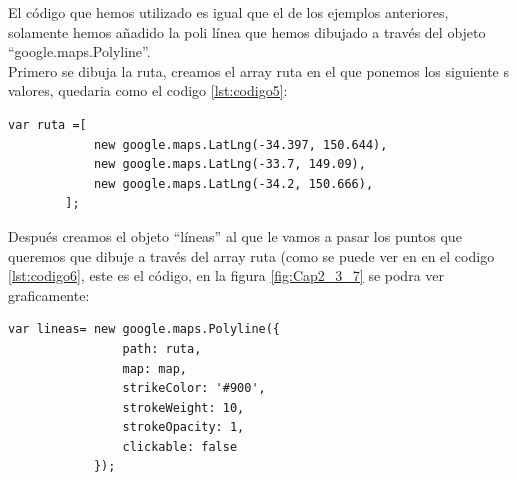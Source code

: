     
     \hspace*{1cm}El código que hemos utilizado es igual que el de los ejemplos anteriores,           solamente hemos añadido la poli línea que hemos dibujado a través del objeto        “google.maps.Polyline”.\\
    Primero se dibuja la ruta, creamos el array ruta en el que ponemos los siguiente     s valores, quedaria como el codigo \ref{lst:codigo5}:\\
    
    \begin{lstlisting}[language=HTML, caption=Array de rutas, label=lst:codigo5]
    	var ruta =[
    		new google.maps.LatLng(-34.397, 150.644),
    		new google.maps.LatLng(-33.7, 149.09),
    		new google.maps.LatLng(-34.2, 150.666),
    	];
    \end{lstlisting}
    
     \hspace*{1cm}Después creamos el objeto “líneas” al que le vamos a pasar los puntos que queremos que dibuje a través del array ruta (como se puede ver en en el codigo \ref{lst:codigo6}, este es el código, en la figura \ref {fig:Cap2_3_7} se podra ver graficamente:\\
    
    \begin{lstlisting}[language=HTML, caption=Polilinea, label=lst:codigo6]
    	var lineas= new google.maps.Polyline({
				path: ruta,
				map: map,
				strikeColor: '#900',
				strokeWeight: 10,
				strokeOpacity: 1,
				clickable: false
			});
    \end{lstlisting}
    
